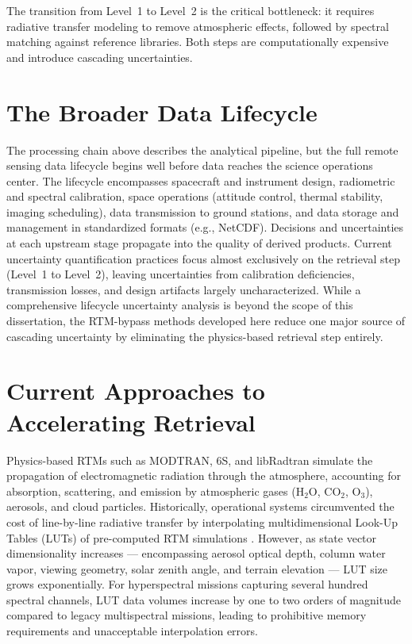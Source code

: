 \documentclass[11pt]{report}
\begin{document}
The transition from Level~1 to Level~2 is the critical bottleneck: it requires radiative transfer modeling to remove atmospheric effects, followed by spectral matching against reference libraries. Both steps are computationally expensive and introduce cascading uncertainties.

\section{The Broader Data Lifecycle}

The processing chain above describes the analytical pipeline, but the full remote sensing data lifecycle begins well before data reaches the science operations center. The lifecycle encompasses spacecraft and instrument design, radiometric and spectral calibration, space operations (attitude control, thermal stability, imaging scheduling), data transmission to ground stations, and data storage and management in standardized formats (e.g., NetCDF). Decisions and uncertainties at each upstream stage propagate into the quality of derived products. Current uncertainty quantification practices focus almost exclusively on the retrieval step (Level~1 to Level~2), leaving uncertainties from calibration deficiencies, transmission losses, and design artifacts largely uncharacterized. While a comprehensive lifecycle uncertainty analysis is beyond the scope of this dissertation, the RTM-bypass methods developed here reduce one major source of cascading uncertainty by eliminating the physics-based retrieval step entirely.

\section{Current Approaches to Accelerating Retrieval}
\label{sec:rtm_emulation}

Physics-based RTMs such as MODTRAN, 6S, and libRadtran simulate the propagation of electromagnetic radiation through the atmosphere, accounting for absorption, scattering, and emission by atmospheric gases (H$_2$O, CO$_2$, O$_3$), aerosols, and cloud particles. Historically, operational systems circumvented the cost of line-by-line radiative transfer by interpolating multidimensional Look-Up Tables (LUTs) of pre-computed RTM simulations \cite{servera2019}. However, as state vector dimensionality increases --- encompassing aerosol optical depth, column water vapor, viewing geometry, solar zenith angle, and terrain elevation --- LUT size grows exponentially. For hyperspectral missions capturing several hundred spectral channels, LUT data volumes increase by one to two orders of magnitude compared to legacy multispectral missions, leading to prohibitive memory requirements and unacceptable interpolation errors.
\end{document}
